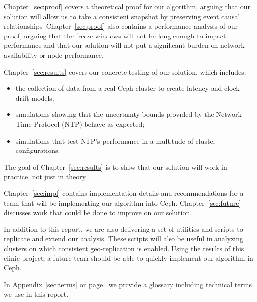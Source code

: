 Chapter~\ref{sec:proof} covers a theoretical proof for our algorithm, arguing
that our solution will allow us to take a consistent snapshot by preserving 
event causal relationships. Chapter~\ref{sec:proof} also contains a 
performance analysis of our proof, arguing that the freeze windows will not be 
long enough to impact performance and that our solution will not put a 
significant burden on network availability or node performance. 

Chapter~\ref{sec:results} covers our concrete testing of our solution, which
includes:
\begin{itemize}
\item the collection of data from a real Ceph cluster to create latency and
clock drift models;
\item simulations showing that the uncertainty bounds provided by the Network 
Time Protocol (NTP) behave as expected;
\item simulations that test NTP's performance in a multitude of cluster
configurations.
\end{itemize}
The goal of Chapter~\ref{sec:results} is to show that our solution will work
in practice, not just in theory.

Chapter~\ref{sec:impl} contains implementation details and recommendations for
a team that will be implementing our algorithm into Ceph. Chapter~\ref{sec:future} 
discusses work that could be done to improve on our solution.

In addition to this report, we are also delivering a set of utilities
and scripts to replicate and extend our analysis. These scripts will
also be useful in analyzing clusters on which consistent
geo-replication is enabled. Using the results of this clinic project,
a future team should be able to quickly implement our algorithm in
Ceph.

In Appendix~\ref{sec:terms} on page~\pageref{sec:terms} we provide
a glossary including technical terms we use in this report.


